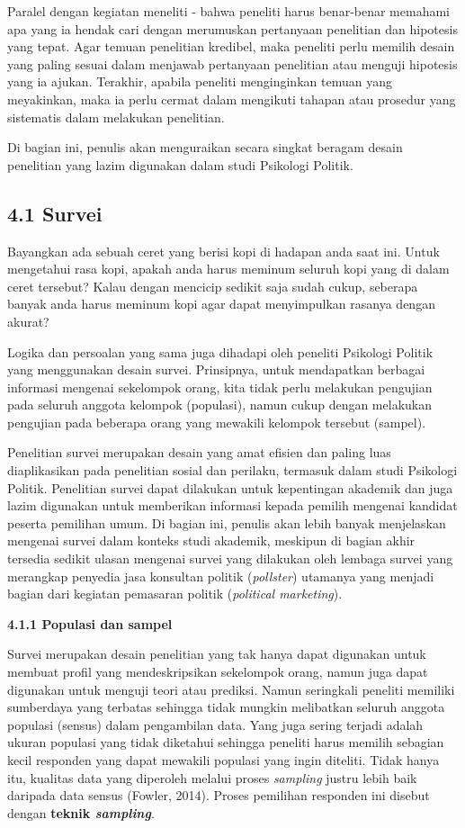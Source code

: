 \documentclass[
  english,
  man]{apa6}
\begin{document}
Paralel dengan kegiatan meneliti - bahwa peneliti harus benar-benar memahami apa yang ia hendak cari dengan merumuskan pertanyaan penelitian dan hipotesis yang tepat. Agar temuan penelitian kredibel, maka peneliti perlu memilih desain yang paling sesuai dalam menjawab pertanyaan penelitian atau menguji hipotesis yang ia ajukan. Terakhir, apabila peneliti menginginkan temuan yang meyakinkan, maka ia perlu cermat dalam mengikuti tahapan atau prosedur yang sistematis dalam melakukan penelitian.

Di bagian ini, penulis akan menguraikan secara singkat beragam desain penelitian yang lazim digunakan dalam studi Psikologi Politik.

\hypertarget{survei}{%
\subsection{4.1 Survei}\label{survei}}

Bayangkan ada sebuah ceret yang berisi kopi di hadapan anda saat ini. Untuk mengetahui rasa kopi, apakah anda harus meminum seluruh kopi yang di dalam ceret tersebut? Kalau dengan mencicip sedikit saja sudah cukup, seberapa banyak anda harus meminum kopi agar dapat menyimpulkan rasanya dengan akurat?

Logika dan persoalan yang sama juga dihadapi oleh peneliti Psikologi Politik yang menggunakan desain survei. Prinsipnya, untuk mendapatkan berbagai informasi mengenai sekelompok orang, kita tidak perlu melakukan pengujian pada seluruh anggota kelompok (populasi), namun cukup dengan melakukan pengujian pada beberapa orang yang mewakili kelompok tersebut (sampel).

Penelitian survei merupakan desain yang amat efisien dan paling luas diaplikasikan pada penelitian sosial dan perilaku, termasuk dalam studi Psikologi Politik. Penelitian survei dapat dilakukan untuk kepentingan akademik dan juga lazim digunakan untuk memberikan informasi kepada pemilih mengenai kandidat peserta pemilihan umum. Di bagian ini, penulis akan lebih banyak menjelaskan mengenai survei dalam konteks studi akademik, meskipun di bagian akhir tersedia sedikit ulasan mengenai survei yang dilakukan oleh lembaga survei yang merangkap penyedia jasa konsultan politik (\emph{pollster}) utamanya yang menjadi bagian dari kegiatan pemasaran politik (\emph{political marketing}).

\textbf{4.1.1 Populasi dan sampel}

Survei merupakan desain penelitian yang tak hanya dapat digunakan untuk membuat profil yang mendeskripsikan sekelompok orang, namun juga dapat digunakan untuk menguji teori atau prediksi. Namun seringkali peneliti memiliki sumberdaya yang terbatas sehingga tidak mungkin melibatkan seluruh anggota populasi (sensus) dalam pengambilan data. Yang juga sering terjadi adalah ukuran populasi yang tidak diketahui sehingga peneliti harus memilih sebagian kecil responden yang dapat mewakili populasi yang ingin diteliti. Tidak hanya itu, kualitas data yang diperoleh melalui proses \emph{sampling} justru lebih baik daripada data sensus (Fowler, 2014). Proses pemilihan responden ini disebut dengan \textbf{teknik \emph{sampling}}.
\end{document}
